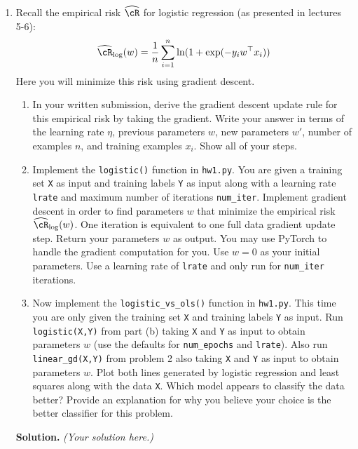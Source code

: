 \documentclass{article}
\def\hcR{\widehat{\cR}}
\theoremstyle{definition}
\theoremstyle{remark}
\newenvironment{Q}
        {%
          \clearpage
          \item
        }
        {%
          \phantom{s} %
          \bigskip
          \textbf{Solution.}
        }
\begin{document}
\begin{enumerate}
\begin{Q}
          Recall the empirical risk $\hcR$ for logistic regression (as presented in lectures 5-6):
          \begin{align*}
          \hcR_{\log}(w) = \frac{1}{n} \sum_{i=1}^n \ln ( 1 + \exp( - y_i w^\top x_i ) )
          \end{align*}
          Here you will minimize this risk using gradient descent.
          \begin{enumerate}
          \item In your written submission, derive the gradient descent update rule for this empirical risk by taking the gradient.  Write your answer in terms of the learning rate $\eta$, previous parameters $w$, new parameters $w'$, number of examples $n$, and training examples $x_i$.  Show all of your steps.
          \item Implement the \texttt{logistic()} function in \texttt{hw1.py}.  You are given a training set \texttt{X} as input and training labels \texttt{Y} as input along with a learning rate \texttt{lrate} and maximum number of iterations \texttt{num\_iter}.  Implement gradient descent in order to find parameters $w$ that minimize the empirical risk $\hcR_{\log}(w)$.  One iteration is equivalent to one full data gradient update step.  Return your parameters $w$ as output.  You may use PyTorch to handle the gradient computation for you.  Use $w = 0$ as your initial parameters.  Use a learning rate of \texttt{lrate} and only run for \texttt{num\_iter} iterations.
          \item Now implement the \texttt{logistic\_vs\_ols()} function in \texttt{hw1.py}.  This time you are only given the training set \texttt{X} and training labels \texttt{Y} as input.  Run \texttt{logistic(X,Y)} from part (b) taking \texttt{X} and \texttt{Y} as input to obtain parameters $w$ (use the defaults for \texttt{num\_epochs} and \texttt{lrate}).  Also run \texttt{linear\_gd(X,Y)} from problem 2 also taking \texttt{X} and \texttt{Y} as input to obtain parameters $w$.  Plot both lines generated by logistic regression and least squares along with the data \texttt{X}.  Which model appears to classify the data better? Provide an explanation for why you believe your choice is the better classifier for this problem.
          \end{enumerate}
          \end{Q}
          \emph{(Your solution here.)}
        \end{enumerate}


        
\end{document}
